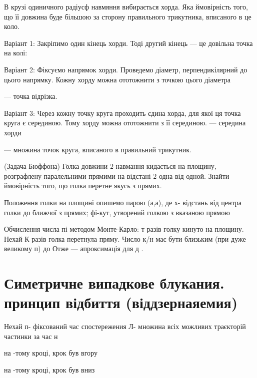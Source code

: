 \begin{problem}    
    В крузі одиничного радіусф навмяння вибирається хорда.
    Яка ймовірність того, що її довжина буде більшою за 
    сторону правильного трикутника, вписаного в це коло.
\end{problem}
\begin{solution}
    Варіант 1: Закріпимо один кінець хорди. Тоді другий
    кінець --- це довільна точка на колі:

    Варіант 2: Фіксуємо напрямок хорди. Проведемо діаметр,
    перпендикілярний до цього напрямку. Кожну хорду можна
    ототожнити з точкою цього діаметра

    --- точка відрізка.

    Варіант 3: Через кожну точку круга проходить єдина
    хорда, для якої ця точка круга є серединою. Тому хорду
    можна ототожнити з її серединою.  --- середина хорди

    --- множина точок круга, вписаного в правильний трикутник.

\end{solution}


\begin{example}
    (Задача Бюффона) Голка довжини $2$ навмання кидається на
    площину, розграфлену паралельними прямими на відстані
    $2$ одна від одной. Знайти ймовірність того, що голка
    перетне якусь з прямих.
\end{example}

\begin{solution}    
    Положення голки на площині опишемо парою (а,а), де
    х- відстань від центра голки до ближчої з прямих;
    фі-кут, утворений голкою з вказаною прямою
    
    Обчислення числа пі методом Монте-Карло: т разів голку
    кинуто на площину. Нехай К разів голка перетнула пряму.
    Число к/н має бути близьким (при дуже великому п) до
    Отже  --- апроксимація для д .
\end{solution}


\chapter{Симетричне випадкове блукания. принцип відбиття (віддзернаяемия)}

Нехай п- фіксований час спостережения
Л- множина всіх можливих траєкторій частинки за час н

на  -тому кроці, крок був вгору

на  -тому кроці, крок був вниз

